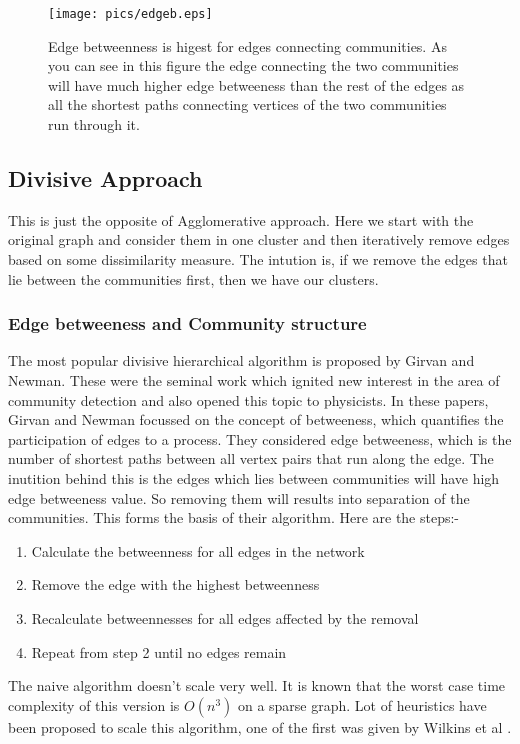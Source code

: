 \documentclass[letterpaper]{article}
\begin{document}
\begin{figure}
\texttt{[image: pics/edgeb.eps]}
\caption{Edge betweenness is higest for edges connecting communities. As you
can see in this figure the edge connecting the two communities will have much
higher edge betweeness than the rest of the edges as all the shortest paths
connecting vertices of the two communities run through it.} \label{fig:edge}
\end{figure}

\subsection{Divisive Approach}
This is just the opposite of Agglomerative approach. Here we start with the
original graph and consider them in one cluster and then iteratively remove
edges based on some dissimilarity measure. The intution is, if we remove the
edges that lie between the communities first, then we have our clusters.

\subsubsection{Edge betweeness and Community structure}
The most popular divisive hierarchical algorithm is proposed by Girvan and
Newman\cite{new2002,new2004}. These were the seminal work which ignited new
interest in the area of community detection and also opened this topic to
physicists. In these papers, Girvan and Newman focussed on the concept of
betweeness, which quantifies the participation of edges to a process. They
considered edge betweeness, which is the number of shortest paths between all
vertex pairs that run along the edge. The inutition behind this is the edges
which lies between communities will have high edge betweeness value. So
removing them will results into separation of the communities. This forms the
basis of their algorithm. Here are the steps:-
\begin{enumerate}
\item Calculate the betweenness for all edges in the network
\item Remove the edge with the highest betweenness
\item Recalculate betweennesses for all edges affected by the removal
\item Repeat from step 2 until no edges remain
\end{enumerate}
The naive algorithm doesn't scale very well. It is known that the worst case
time complexity of this version is $O(n^3)$ on a sparse graph. Lot of heuristics have been
proposed to scale this algorithm, one of the first was given by Wilkins et al \cite{wilkin2004}.
\end{document}
